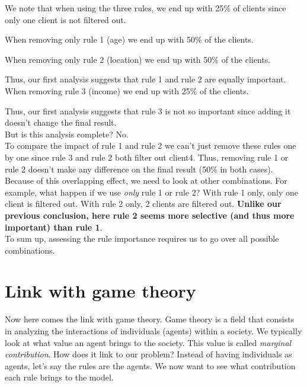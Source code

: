 We note that when using the three rules, we end up with 25\% of clients since only one client is not filtered out. 

When removing only rule 1 (age) we end up with 50\% of the clients. 

When removing only rule 2 (location) we end up with 50\% of the clients.

Thus, our first analysis suggests that rule 1 and rule 2 are equally important. \\

When removing rule 3 (income) we end up with 25\% of the clients.

Thus, our first analysis suggests that rule 3 is not so important since adding it doesn't change the final result. \\

But is this analysis complete? No. \\

To compare the impact of rule 1  and rule 2 we can't just remove these rules one by one since rule 3 and rule 2 both filter out client4. Thus, removing rule 1 or rule 2 doesn't make any difference on the final result (50\% in both cases). Because of this overlapping  effect, we need to look at other combinations. For example, what happen if we use \textit{only} rule 1 or rule 2? With rule 1 only, only one client is filtered out. With rule 2 only, 2 clients are filtered out. \textbf{Unlike our previous conclusion, here rule 2 seems more selective (and thus more important) than rule 1}. \\

To sum up, assessing the rule importance requires us to go over all possible combinations. \\

\section{Link with game theory}

\label{sec:link-with-game-theory}

Now here comes the link with game theory. 
Game theory is a field that consists in analyzing the interactions of individuals (agents) within a society. We typically look at what value an agent brings to the society. This value is called \textit{marginal contribution}. How does it link to our problem? Instead of having individuals as agents, let's say the rules are the agents. We now want to see what contribution each rule brings to the model. \\

